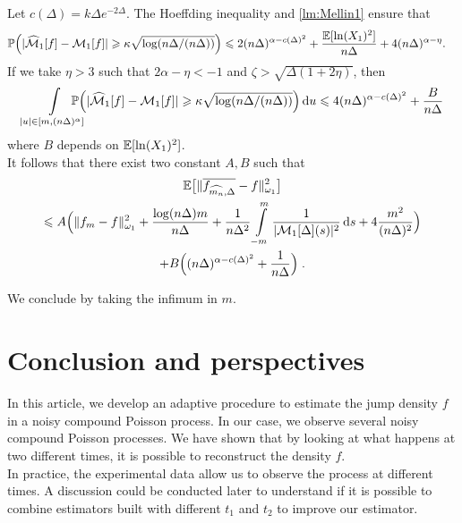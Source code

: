 Let $c(\Delta) = k\Delta e^{-2\Delta}$. The Hoeffding inequality and \cref{lm:Mellin1} ensure that 
\begin{align*}
    \mathbb{P}\Big( |\widehat {\mathcal{M}}_1[f] &- \mathcal{M}_1[f]| \geqslant \kappa \sqrt{\log(n\Delta/(n\Delta))} \Big) 
    \leqslant
    2(n\Delta)^{\alpha - c(\Delta)^2} + \frac{\mathbb{E}[\ln(X_1)^2]}{n\Delta} + 4(n\Delta)^{\alpha-\eta}.
\end{align*}
If we take $\eta> 3$ such that $2\alpha - \eta < -1$ and $\zeta > \sqrt{\Delta(1+2\eta)}$, then 
\begin{align*}
   \int_{|u| \in [m, (n\Delta)^\alpha]} \limits\hspace{-0.5cm} \PP\Big( |\hat \Mcal_1[f] - \Mcal_1[f]| \geq \kappa \sqrt{\log(n\Delta/(n\Delta))} \Big)  \diff u
    \leq 4(n\Delta)^{\alpha - c(\Delta)^2} + \frac{B}{n\Delta}
\end{align*}
where $B$ depends on $\mathbb{E}[\ln(X_1)^2]$.\\

It follows that there exist two constant $A,B$ such that
{\begin{multline*}
    \mathbb{E} \big[ \|\overline{f_{\widehat{m_n}, \Delta}}  - f \|_{\omega_1}^2\big] \\
    \leqslant A \Big(\| f_m - f \|_{\omega_1}^2 + \frac{\log(n\Delta)m}{n\Delta}
    + \frac{1}{n \Delta^2} \int_{-m}^{m} \limits\frac{1}{|\mathcal{M}_1[\Delta](s)|^2}\,\mathrm{d} s 
    + 4 \frac{m^2}{(n \Delta)^{2}} \Big)
    \\
    + B\Big((n\Delta)^{\alpha - c(\Delta)^2} + \frac{1}{n\Delta}\Big)
    \; .
\end{multline*}}

We conclude by taking the infimum in $m$.

\section{Conclusion and perspectives}

In this article, we develop an adaptive procedure to estimate the jump density $f$ in a noisy compound Poisson process. In our case, we observe several noisy compound Poisson processes. We have shown that by looking at what happens at two different times, it is possible to reconstruct the density $f$. \\

In practice, the experimental data allow us to observe the process at different times. A discussion could be conducted later to understand if it is possible to combine estimators built with different $t_1$ and $t_2$ to improve our estimator. 



